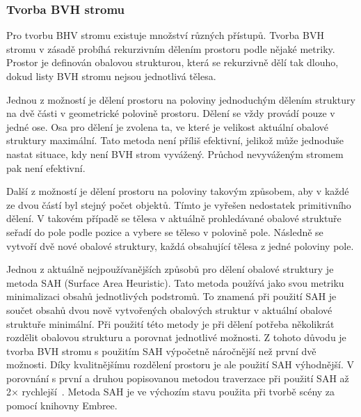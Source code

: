 \documentclass[czech,master]{diploma}
\begin{document}
\subsubsection{Tvorba BVH stromu}
Pro tvorbu BHV stromu existuje množství různých přístupů. Tvorba BVH stromu v zásadě probíhá rekurzivním dělením prostoru podle nějaké metriky. Prostor je definován obalovou strukturou, která se rekurzivně dělí tak dlouho, dokud listy BVH stromu nejsou jednotlivá tělesa.\par
Jednou z možností je dělení prostoru na poloviny jednoduchým dělením struktury na dvě části v geometrické polovině prostoru. Dělení se vždy provádí pouze v jedné ose. Osa pro dělení je zvolena ta, ve které je velikost aktuální obalové struktury maximální. Tato metoda není příliš efektivní, jelikož může jednoduše nastat situace, kdy není BVH strom vyvážený. Průchod nevyváženým stromem pak není efektivní.\par
Další z možností je dělení prostoru na poloviny takovým způsobem, aby v každé ze dvou částí byl stejný počet objektů. Tímto je vyřešen nedostatek primitivního dělení. V takovém případě se tělesa v aktuálně prohledávané obalové struktuře seřadí do pole podle pozice a vybere se těleso v polovině pole. Následně se vytvoří dvě nové obalové struktury, každá obsahující tělesa z jedné poloviny pole.\par
Jednou z aktuálně nejpoužívanějších způsobů pro dělení obalové struktury je metoda SAH (Surface Area Heuristic). Tato metoda používá jako svou metriku minimalizaci obsahů jednotlivých podstromů. To znamená při použití SAH je součet obsahů dvou nově vytvořených obalových struktur v aktuální obalové struktuře minimální. Při použití této metody je při dělení potřeba několikrát rozdělit obalovou strukturu a porovnat jednotlivé možnosti. Z tohoto důvodu je tvorba BVH stromu s použitím SAH výpočetně náročnější než první dvě možnosti. Díky kvalitnějšímu rozdělení prostoru je ale použití SAH výhodnější. V porovnání s první a druhou popisovanou metodou traverzace při použití SAH až 2\(\times\) rychlejší~\cite{SAH}. Metoda SAH je ve výchozím stavu použita při tvorbě scény za pomocí knihovny Embree.
\end{document}
